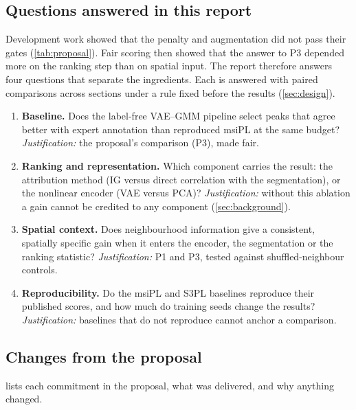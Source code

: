 \subsection{Questions answered in this report}
Development work showed that the penalty and augmentation did not pass their
gates (\cref{tab:proposal}). Fair scoring then showed that the answer to P3
depended more on the ranking step than on spatial input. The report therefore
answers four questions that separate the ingredients. Each is answered with
paired comparisons across sections under a rule fixed before the results
(\cref{sec:design}).
\begin{enumerate}[label=RQ\arabic*.]
  \item \textbf{Baseline.} Does the label-free VAE--GMM pipeline select peaks
        that agree better with expert annotation than reproduced msiPL at the
        same budget?
        \emph{Justification:} the proposal's comparison (P3), made fair.
  \item \textbf{Ranking and representation.} Which component carries the
        result: the attribution method (IG versus direct correlation with the
        segmentation), or the nonlinear encoder (VAE versus PCA)?
        \emph{Justification:} without this ablation a gain cannot be credited
        to any component (\cref{sec:background}).
  \item \textbf{Spatial context.} Does neighbourhood information give a
        consistent, spatially specific gain when it enters the encoder, the
        segmentation or the ranking statistic?
        \emph{Justification:} P1 and P3, tested against shuffled-neighbour
        controls.
  \item \textbf{Reproducibility.} Do the msiPL and S3PL baselines reproduce
        their published scores, and how much do training seeds change the
        results?
        \emph{Justification:} baselines that do not reproduce cannot anchor a
        comparison.
\end{enumerate}

\subsection{Changes from the proposal}
 lists each commitment in the proposal, what was
delivered, and why anything changed.

